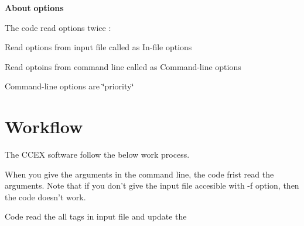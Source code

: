 {\bfseries About} {\bfseries options} 

The code read options twice \-:
\begin{DoxyItemize}
\item Read options from input file called as In-\/file options
\item Read optoins from command line called as Command-\/line options \par
 Command-\/line options are \char`\"{}priority\char`\"{}
\end{DoxyItemize}\hypertarget{GettingStarted_Workflow}{}\section{Workflow}\label{GettingStarted_Workflow}
The C\-C\-E\-X software follow the below work process.

When you give the arguments in the command line, the code frist read the arguments. Note that if you don't give the input file accesible with -\/f option, then the code doesn't work.

Code read the all tags in input file and update the

 